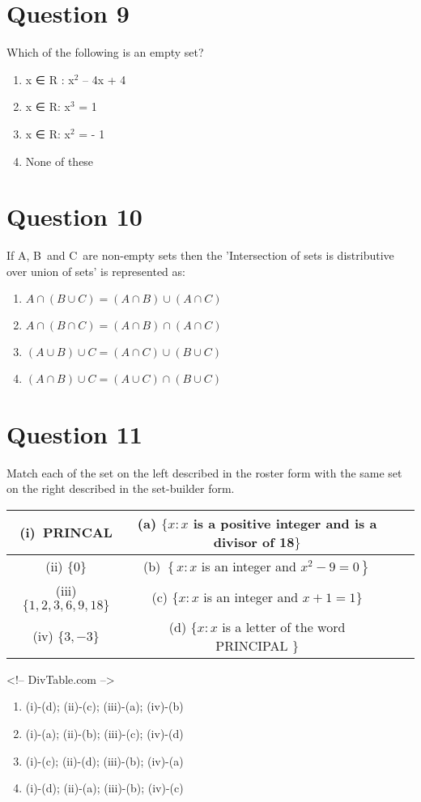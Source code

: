 \documentclass{article}
\begin{document}
\section*{Question 9}
Which of the following is an empty set?\newline
\begin{enumerate}[label=(\alph*)]
\item {x ∈ R : x$^{2}$ – 4x + 4}\newline
\item {x ∈ R: x$^{3}$ = 1}\newline
\item {x ∈ R: x$^{2}$ = - 1}
\item None of these\newline
\end{enumerate}
\newpage
\section*{Question 10}
If A, B and C are non-empty sets then the 'Intersection of sets is distributive over union of sets' is represented as:
\begin{enumerate}[label=(\alph*)]
\item \(A \cap(B \cup C)=(A \cap B) \cup(A \cap C)\)\newline
\item \(A \cap(B \cap C)=(A \cap B) \cap(A \cap C)\)\newline
\item \((A \cup B) \cup C=(A \cap C) \cup(B \cup C)\)\newline
\item \((A \cap B) \cup C=(A \cup C) \cap(B \cup C)\)\newline
\end{enumerate}
\newpage
\section*{Question 11}
Match each of the set on the left described in the roster form with the same set on the right described in the set-builder form.\begin{tabular}{|c|c|c|c|}
\hline
(i) {PRINCAL} & (a) \(\{x: x\) is a positive integer and is a divisor of 18\(\}\) \\
\hline
(ii) \(\{0\}\) & (b) \(\left\{x: x\right.\) is an integer and \(\left.x^2-9=0\right\}\) \\
\hline
(iii) \(\{1,2,3,6,9,18\}\) & (c) \(\{x: x\) is an integer and \(x+1=1\}\) \\
\hline
(iv) \(\{3,-3\}\) & (d) \(\{x: x\) is a letter of the word PRINCIPAL \(\}\) \\
\hline
\end{tabular}
<!-- DivTable.com -->
\begin{enumerate}[label=(\alph*)]
\item (i)-(d); (ii)-(c); (iii)-(a); (iv)-(b)
\item (i)-(a); (ii)-(b); (iii)-(c); (iv)-(d)\newline
\item (i)-(c); (ii)-(d); (iii)-(b); (iv)-(a)
\item (i)-(d); (ii)-(a); (iii)-(b); (iv)-(c)
\end{enumerate}
\newpage
\end{document}
